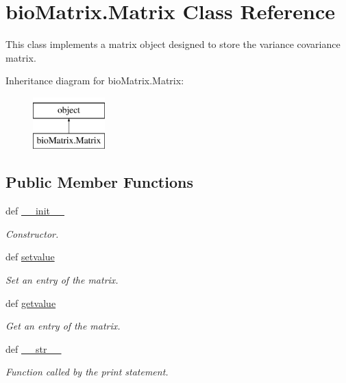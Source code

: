 \hypertarget{classbio_matrix_1_1_matrix}{\section{bio\+Matrix.\+Matrix Class Reference}
\label{classbio_matrix_1_1_matrix}
}


This class implements a matrix object designed to store the variance covariance matrix.  


Inheritance diagram for bio\+Matrix.\+Matrix\+:\begin{figure}[H]
\begin{center}
\leavevmode
\includegraphics[height=2.000000cm]{d1/db8/classbio_matrix_1_1_matrix}
\end{center}
\end{figure}
\subsection*{Public Member Functions}
\begin{DoxyCompactItemize}
\item 
def \hyperlink{classbio_matrix_1_1_matrix_a9893856a88edb48ef2870c0d4a1304aa}{\+\_\+\+\_\+init\+\_\+\+\_\+}
\begin{DoxyCompactList}\small\item\em Constructor. \end{DoxyCompactList}\item 
def \hyperlink{classbio_matrix_1_1_matrix_af6d75761f0308064b23fc469174884cd}{setvalue}
\begin{DoxyCompactList}\small\item\em Set an entry of the matrix. \end{DoxyCompactList}\item 
def \hyperlink{classbio_matrix_1_1_matrix_ae2384d421643b6b09cce77655278b95e}{getvalue}
\begin{DoxyCompactList}\small\item\em Get an entry of the matrix. \end{DoxyCompactList}\item 
def \hyperlink{classbio_matrix_1_1_matrix_a2f25e3d580a33c70791c8c8d5c0b6538}{\+\_\+\+\_\+str\+\_\+\+\_\+}
\begin{DoxyCompactList}\small\item\em Function called by the print statement. \end{DoxyCompactList}\end{DoxyCompactItemize}
